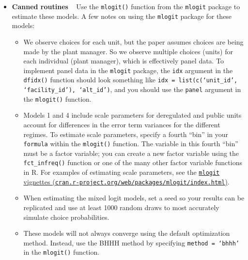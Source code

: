 \documentclass[11pt,letterpaper]{article}
\begin{document}
\begin{itemize}[label={}, leftmargin=*]
	\item \textbf{Canned routines} ~ Use the \texttt{mlogit()} function from the \texttt{mlogit} package to estimate these models. A few notes on using the \texttt{mlogit} package for these models:
	\begin{itemize}
		\item We observe choices for each unit, but the paper assumes choices are being made by the plant manager. So we observe multiple choices (units) for each individual (plant manager), which is effectively panel data. To implement panel data in the \texttt{mlogit} package, the \texttt{idx} argument in the \texttt{dfidx()} function should look something like \texttt{idx = list(c(`unit\_id', `facility\_id'), `alt\_id')}, and you should use the \texttt{panel} argument in the \texttt{mlogit()} function.
		\item Models 1 and 4 include scale parameters for deregulated and public units account for differences in the error term variances for the different regimes. To estimate scale parameters, specify a fourth ``bin'' in your \texttt{formula} within the \texttt{mlogit()} function. The variable in this fourth ``bin'' must be a factor variable; you can create a new factor variable using the \texttt{fct\_infreq()} function or one of the many other factor variable functions in R. For examples of estimating scale parameters, see the \href{https://cran.r-project.org/web/packages/mlogit/index.html}{\texttt{mlogit} vignettes (\texttt{cran.r-project.org/web/packages/mlogit/index.html})}.
		\item When estimating the mixed logit models, set a seed so your results can be replicated and use at least 1000 random draws to most accurately simulate choice probabilities.
		\item These models will not always converge using the default optimization method. Instead, use the BHHH method by specifying \texttt{method = `bhhh'} in the \texttt{mlogit()} function.
	\end{itemize}


\end{itemize}
\end{document}

